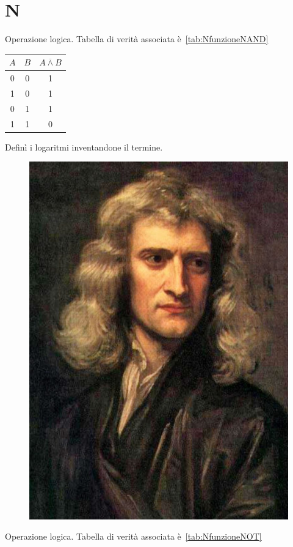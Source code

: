 \chapter{N}
\vspace{5mm}
Operazione logica. Tabella di verità associata è~\vref{tab:NfunzioneNAND}
\begin{table}
	\label{tab:NfunzioneNAND}
	\centering
	\begin{tabular}{ccc}
		\toprule
	$A$&$B$&$A\mathbin{\overline{\wedge}}B$\\
	\midrule
	0&0&1\\
	1&0&1\\
	0&1&1\\
	1&1&0\\
	\bottomrule
	\end{tabular}
\end{table}
 Definì i logaritmi inventandone il termine.
\begin{figure}
	\centering
	\label{fig:godfreykneller-isaacnewton-1689}
	\includegraphics[width=0.7\linewidth]{Figure/N/GodfreyKneller-IsaacNewton-1689}
\end{figure}
Operazione logica. Tabella di verità associata è~\vref{tab:NfunzioneNOT}
